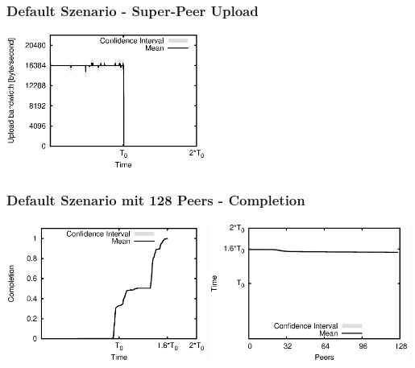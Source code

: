\begin{frame}
  \frametitle{Default Szenario - Super-Peer Upload}
  \begin{center}
    \includegraphics[width=0.49\textwidth]{fig/plots/scenario_1_default/plots/GeneratedMeanCurrentSuperSeederUploadBandwidth.csv.eps}
  \end{center}
\end{frame}


\begin{frame}
  \frametitle{Default Szenario mit 128 Peers - Completion}
  \begin{center}
    \includegraphics[width=0.49\textwidth]{fig/plots/scenario_4_peer_count_128/plots/GeneratedMeanChunkCompletion.csv.eps}
    \hfill
    \includegraphics[width=0.49\textwidth]{fig/plots/scenario_4_peer_count_128/plots/GeneratedMeanSortedChunkCompletion.csv.eps}
  \end{center}
\end{frame}


